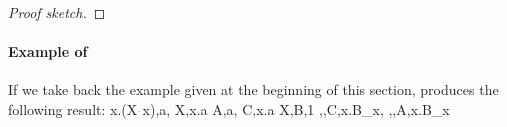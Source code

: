 \documentclass[sigconf,natbib=false,review]{acmart}
\newcommand{\appsep}{\ensuremath{\textcolor{lightgray}{\cdot}}}
\newcommand{\linkMacro}[1]{\ensuremath{#1}\texttt{-link}\xspace}
\newcommand{\linketa} {\linkMacro{\eta}}
\begin{document}
\begin{proof}[Proof sketch]
\end{proof}



\paragraph{Example of \mapdeduplication}
If we take back the example given at the beginning of this section,
\mapdeduplication produces the following result:
% 
\printAlll
  {{{\lambda x.(X\appsep x),a},
    {X,\lambda x.a}}}
  {{{A,a},
    {C,\lambda x.a}}}
  {{{X,B,1}}}
  {{{\eta,,C,\lambda x.B_{x}},
    {\eta,,A,\lambda x.B_{x}}}}
\end{document}
